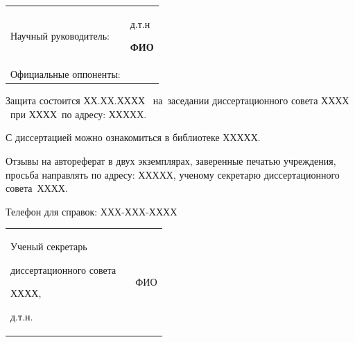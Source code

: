 \vspace{0.008\paperheight plus1fill}
\noindent%
\begin{tabularx}{\textwidth}{@{}lX@{}}
    Научный руководитель:   & д.т.н \par
                              \textbf{ФИО}
    \vspace{0.013\paperheight}\\
    Официальные оппоненты:  &
    \vspace{0.013\paperheight} \\
\end{tabularx}
\vspace{0.008\paperheight plus1fill}

\noindent Защита состоится ХХ.ХХ.ХХХХ ~на~заседании диссертационного совета ХХХХ ~при ХХХХ~по адресу: ХХХХХ.

\vspace{0.008\paperheight plus1fill}
\noindent С диссертацией можно ознакомиться в библиотеке ХХХХХ.

\vspace{0.008\paperheight plus1fill}
\noindent Отзывы на автореферат в двух экземплярах, заверенные печатью учреждения, просьба направлять по адресу: ХХХХХ, ученому секретарю диссертационного совета~ХХХХ.

\vspace{0.008\paperheight plus1fill}

\noindent Телефон для справок: ХХХ-ХХХ-ХХХХ

\vspace{0.008\paperheight plus1fill}
\noindent%
\begin{tabularx}{\textwidth}{@{}%
>{\raggedright\arraybackslash}b{18em}@{}
>{\centering\arraybackslash}X
r
@{}}
    Ученый секретарь\par
    диссертационного совета\par
    ХХХХ,\par
    д.т.н.
    &
    &
    ФИО
\end{tabularx}

